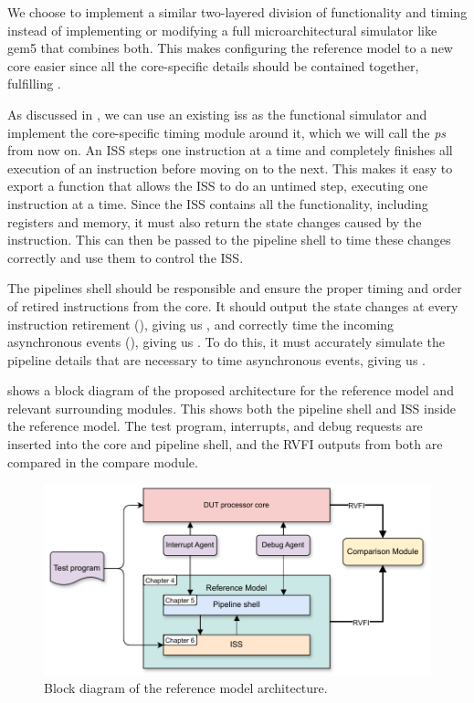 We choose to implement a similar two-layered division of functionality and timing instead of implementing or modifying a full microarchitectural simulator like gem5 \cite{Gem5Simulator2023} that combines both. This makes configuring the reference model to a new core easier since all the core-specific details should be contained together, fulfilling . 


As discussed in , we can use an existing \acrshort{iss} as the functional simulator and implement the core-specific timing module around it, which we will call the \textit{\gls{ps}} from now on. An ISS steps one instruction at a time and completely finishes all execution of an instruction before moving on to the next. This makes it easy to export a  function that allows the ISS to do an untimed step, executing one instruction at a time. Since the ISS contains all the functionality, including registers and memory, it must also return the state changes caused by the instruction. This can then be passed to the pipeline shell to time these changes correctly and use them to control the ISS.

The pipelines shell should be responsible  and ensure the proper timing and order of retired instructions from the core. It should output the state changes at every instruction retirement (), giving us \textbf{}, and correctly time the incoming asynchronous events (), giving us \textbf{}. To do this, it must accurately simulate the pipeline details that are necessary to time asynchronous events, giving us \textbf{}. 

 shows a block diagram of the proposed architecture for the reference model and relevant surrounding modules. This shows both the pipeline shell and ISS inside the reference model. The test program, interrupts, and debug requests are inserted into the core and pipeline shell, and the RVFI outputs from both are compared in the compare module.

\begin{figure}
    \centering
    \includegraphics[width=0.75\linewidth]{figures/Architecture.pdf}
    \caption{Block diagram of the reference model architecture.}
    \label{fig:architecture}
\end{figure}

